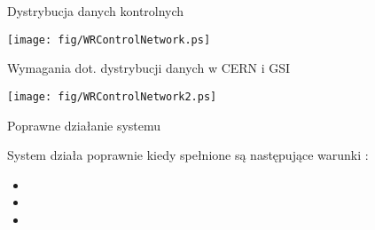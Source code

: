 \documentclass[compress,red]{beamer}
\begin{document}
\begin{frame}{Dystrybucja danych kontrolnych}

    \begin{center}
    \texttt{[image: fig/WRControlNetwork.ps]}
    \end{center}


\end{frame}
\begin{frame}{Wymagania dot. dystrybucji danych w CERN i GSI}

    \begin{center}
    \texttt{[image: fig/WRControlNetwork2.ps]}
    \end{center}


\end{frame}
\begin{frame}{Poprawne działanie systemu}


  System działa poprawnie kiedy spełnione są następujące warunki :
  
  \begin{itemize}
    \item \color{blue}{Wszystkie odbiorniki (nodes) są z synchronizowane z wymaganą dokładnością}
    \item  \color{red}{Wszystkie odbiorniki (nodes) otrzymują dane kontrolne (Control Messages)}
    \item  \color{red}{Dane kontrolne (Control Messages) docierają do wszystkich odbiorników (nodes)
          w czasie mniejszym niż wymagana maksymalna latencja.}
  \end{itemize}

\end{frame}
\end{document}
